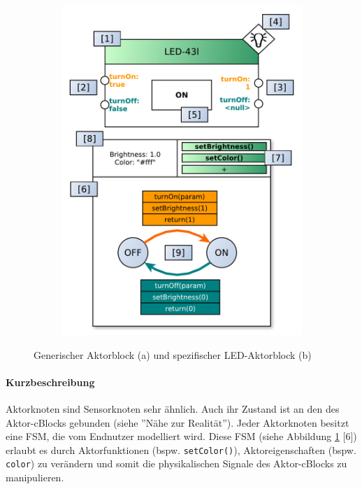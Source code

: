 \begin{figure}[h]
\begin{subfigure}{.55\textwidth}
  \includegraphics[width=1\linewidth]{bilder/chapter4/chapter4_3/instanceLEDactornode.pdf}
  \caption{}
  \label{fig:actorled}
\end{subfigure}
    \caption{Generischer Aktorblock (a) und spezifischer LED-Aktorblock (b)}
    \label{fig:actornodes}
\end{figure}


\paragraph{Kurzbeschreibung} Aktorknoten sind Sensorknoten sehr ähnlich. Auch ihr Zustand ist an den des Aktor-cBlocks gebunden (siehe ''Nähe zur Realität''). Jeder Aktorknoten besitzt eine \ac{FSM}, die vom Endnutzer modelliert wird. Diese \ac{FSM} (siehe Abbildung \ref{fig:actorled} [6]) erlaubt es durch Aktorfunktionen (bspw. \texttt{setColor()}), Aktoreigenschaften (bspw. \texttt{color}) zu verändern und somit die physikalischen Signale des Aktor-cBlocks zu manipulieren.

